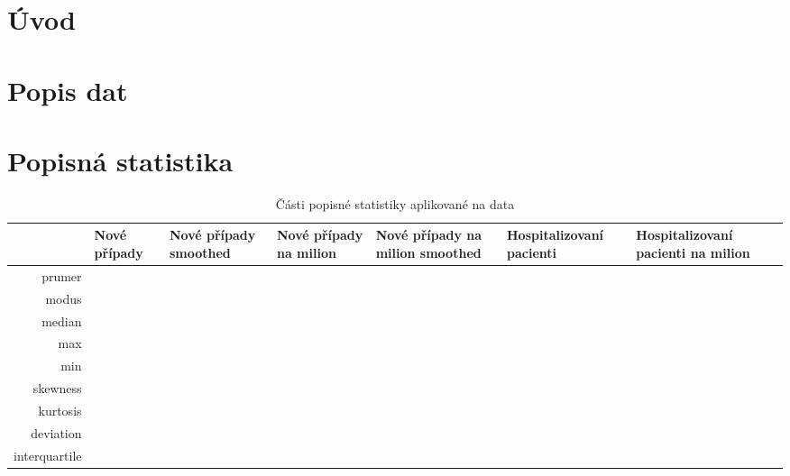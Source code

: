 \documentclass[a4paper]{ article}
\begin{document}



\titulniStrana
\generujObsah			%
\generujSeznamObrazku		%
\generujSeznamTabulek		%



\clearpage
\pagestyle{plain}		%
 {}
\section*{Úvod}
\label{uvod}





\section{Popis dat}

\section{Popisná statistika}
\begin{table}[ht]
\centering
\begin{tabular}{rllllll}
  \hline
 & Nové případy & Nové případy smoothed & Nové případy na milion & Nové případy na milion smoothed & Hospitalizovaní pacienti & Hospitalizovaní pacienti na milion \\ 
  \hline
prumer &  &  &  &  &  &  \\ 
  modus &  &  &  &  &  &  \\ 
  median &  &  &  &  &  &  \\ 
  max &  &  &  &  &  &  \\ 
  min &  &  &  &  &  &  \\ 
  skewness &  &  &  &  &  &  \\ 
  kurtosis &  &  &  &  &  &  \\ 
  deviation &  &  &  &  &  &  \\ 
  interquartile &  &  &  &  &  &  \\ 
   \hline
\end{tabular}
\caption{Části popisné statistiky aplikované na data} 
\label{table:popisStat}
\end{table}\clearpage
\end{document}
